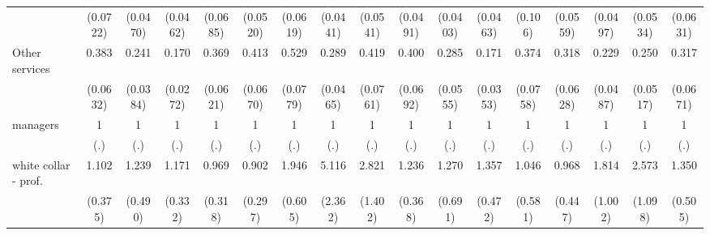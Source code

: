 {\begin{tabular}{l*{16}{c}}
                    &    (0.0722)         &    (0.0470)         &    (0.0462)         &    (0.0685)         &    (0.0520)         &    (0.0619)         &    (0.0441)         &    (0.0541)         &    (0.0491)         &    (0.0403)         &    (0.0463)         &     (0.106)         &    (0.0559)         &    (0.0497)         &    (0.0534)         &    (0.0631)         \\
[1em]
Other services      &       0.383\sym{***}&       0.241\sym{***}&       0.170\sym{***}&       0.369\sym{***}&       0.413\sym{***}&       0.529\sym{***}&       0.289\sym{***}&       0.419\sym{***}&       0.400\sym{***}&       0.285\sym{***}&       0.171\sym{***}&       0.374\sym{***}&       0.318\sym{***}&       0.229\sym{***}&       0.250\sym{***}&       0.317\sym{***}\\
                    &    (0.0632)         &    (0.0384)         &    (0.0272)         &    (0.0621)         &    (0.0670)         &    (0.0779)         &    (0.0465)         &    (0.0761)         &    (0.0692)         &    (0.0555)         &    (0.0353)         &    (0.0758)         &    (0.0628)         &    (0.0487)         &    (0.0517)         &    (0.0671)         \\
[1em]
managers            &           1         &           1         &           1         &           1         &           1         &           1         &           1         &           1         &           1         &           1         &           1         &           1         &           1         &           1         &           1         &           1         \\
                    &         (.)         &         (.)         &         (.)         &         (.)         &         (.)         &         (.)         &         (.)         &         (.)         &         (.)         &         (.)         &         (.)         &         (.)         &         (.)         &         (.)         &         (.)         &         (.)         \\
[1em]
white collar - prof.&       1.102         &       1.239         &       1.171         &       0.969         &       0.902         &       1.946\sym{*}  &       5.116\sym{***}&       2.821\sym{*}  &       1.236         &       1.270         &       1.357         &       1.046         &       0.968         &       1.814         &       2.573\sym{*}  &       1.350         \\
                    &     (0.375)         &     (0.490)         &     (0.332)         &     (0.318)         &     (0.297)         &     (0.605)         &     (2.362)         &     (1.402)         &     (0.368)         &     (0.691)         &     (0.472)         &     (0.581)         &     (0.447)         &     (1.002)         &     (1.098)         &     (0.505)         \\

\end{tabular}}
